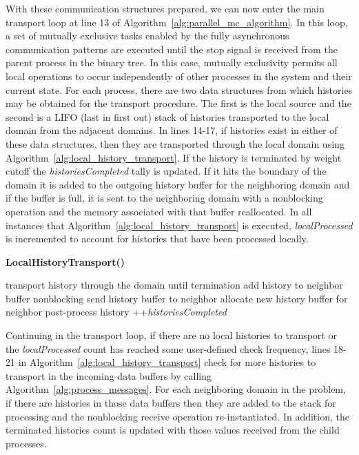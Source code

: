 With these communication structures prepared, we can now enter the
main transport loop at line 13 of
Algorithm~\ref{alg:parallel_mc_algorithm}. In this loop, a set of
mutually exclusive tasks enabled by the fully asynchronous
communication patterns are executed until the stop signal is received
from the parent process in the binary tree. In this case, mutually
exclusivity permits all local operations to occur independently of
other processes in the system and their current state. For each
process, there are two data structures from which histories may be
obtained for the transport procedure. The first is the local source
and the second is a LIFO (last in first out) stack of histories
transported to the local domain from the adjacent domains. In lines
14-17, if histories exist in either of these data structures, then
they are transported through the local domain using
Algorithm~\ref{alg:local_history_transport}. If the history is
terminated by weight cutoff the \textit{historiesCompleted} tally is
updated. If it hits the boundary of the domain it is added to the
outgoing history buffer for the neighboring domain and if the buffer
is full, it is sent to the neighboring domain with a nonblocking
operation and the memory associated with that buffer reallocated. In
all instances that Algorithm~\ref{alg:local_history_transport} is
executed, \textit{localProcessed} is incremented to account for
histories that have been processed locally.

\begin{algorithm}[h!]
  \caption{\textbf{LocalHistoryTransport()}}
  \label{alg:local_history_transport}
  \begin{algorithmic}[1]
    \State transport history through the domain until termination
    \State add history to neighbor buffer
    \State nonblocking send history buffer to neighbor
    \State allocate new history buffer for neighbor
    \EndIf
    \Else
    \State post-process history
    \State ++\textit{historiesCompleted}
    \EndIf
    \EndIf
  \end{algorithmic}
\end{algorithm}

Continuing in the transport loop, if there are no local histories to
transport or the \textit{localProcessed} count has reached some
user-defined check frequency, lines 18-21 in
Algorithm~\ref{alg:local_history_transport} check for more histories
to transport in the incoming data buffers by calling
Algorithm~\ref{alg:process_messages}. For each neighboring domain in
the problem, if there are histories in those data buffers then they
are added to the stack for processing and the nonblocking receive
operation re-instantiated. In addition, the terminated histories count
is updated with those values received from the child processes.

